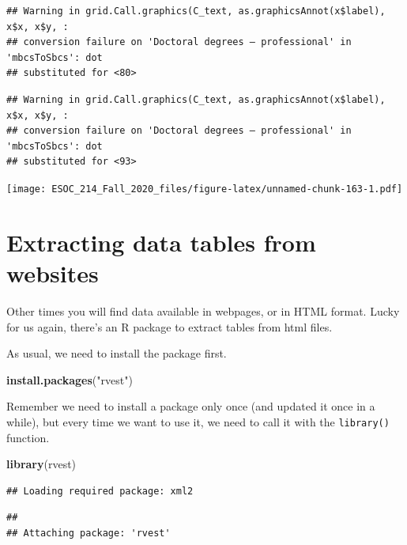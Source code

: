 \documentclass[
]{book}
\newenvironment{Shaded}{\begin{snugshade}}{\end{snugshade}}
\newcommand{\KeywordTok}[1]{\textcolor[rgb]{0.13,0.29,0.53}{\textbf{#1}}}
\newcommand{\NormalTok}[1]{#1}
\newcommand{\StringTok}[1]{\textcolor[rgb]{0.31,0.60,0.02}{#1}}
\begin{document}
\begin{verbatim}
## Warning in grid.Call.graphics(C_text, as.graphicsAnnot(x$label), x$x, x$y, :
## conversion failure on 'Doctoral degrees – professional' in 'mbcsToSbcs': dot
## substituted for <80>
\end{verbatim}

\begin{verbatim}
## Warning in grid.Call.graphics(C_text, as.graphicsAnnot(x$label), x$x, x$y, :
## conversion failure on 'Doctoral degrees – professional' in 'mbcsToSbcs': dot
## substituted for <93>
\end{verbatim}

\texttt{[image: ESOC\_214\_Fall\_2020\_files/figure-latex/unnamed-chunk-163-1.pdf]}

\hypertarget{extracting-data-tables-from-websites}{%
\section{Extracting data tables from websites}\label{extracting-data-tables-from-websites}}

Other times you will find data available in webpages, or in HTML format. Lucky for us again, there's an R package to extract tables from html files.

As usual, we need to install the package first.

\begin{Shaded}
\begin{Highlighting}[]
\KeywordTok{install.packages}\NormalTok{(}\StringTok{"rvest"}\NormalTok{)}
\end{Highlighting}
\end{Shaded}

Remember we need to install a package only once (and updated it once in a while), but every time we want to use it, we need to call it with the \texttt{library()} function.

\begin{Shaded}
\begin{Highlighting}[]
\KeywordTok{library}\NormalTok{(rvest)}
\end{Highlighting}
\end{Shaded}

\begin{verbatim}
## Loading required package: xml2
\end{verbatim}

\begin{verbatim}
## 
## Attaching package: 'rvest'
\end{verbatim}
\end{document}
